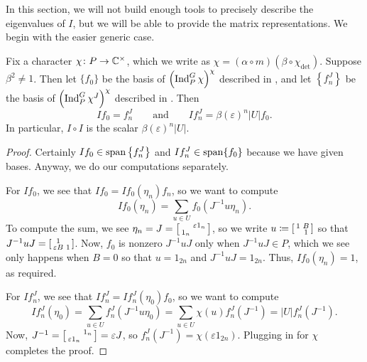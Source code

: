 In this section, we will not build enough tools to precisely describe the eigenvalues of $I$, but we will be able to provide the matrix representations. We begin with the easier generic case.
\begin{proposition} \label{prop:generic-intertwining}
	Fix a character $\chi\colon P\to\mathbb C^\times$, which we write as $\chi=(\alpha\circ m)(\beta\circ\chi_{\det})$. Suppose $\beta^2\ne1$. Then let $\{f_0\}$ be the basis of $\left(\operatorname{Ind}_P^G\chi\right)^\chi$ described in , and let $\left\{f_n^J\right\}$ be the basis of $\left(\operatorname{Ind}_P^G\chi^J\right)^\chi$ described in . Then
	\[If_0=f_n^J\qquad\text{and}\qquad If_n^J=\beta(\varepsilon)^n\left|U\right|f_0.\]
	In particular, $I\circ I$ is the scalar $\beta(\varepsilon)^n\left|U\right|$.
\end{proposition}
\begin{proof}
	Certainly $If_0\in\operatorname{span}\left\{f_n^J\right\}$ and $If_n^J\in\operatorname{span}\{f_0\}$ because we have given bases. Anyway, we do our computations separately.
	
	For $If_0$, we see that $If_0=If_0(\eta_n)f_n$, so we want to compute
	\[If_0(\eta_n)=\sum_{u\in U}f_0\left(J^{-1}u\eta_n\right).\]
	To compute the sum, we see $\eta_n=J=\begin{bsmallmatrix}
		& \varepsilon1_n \\ 1_n
	\end{bsmallmatrix}$, so we write $u\coloneqq\begin{bsmallmatrix}
		1 & B \\ & 1
	\end{bsmallmatrix}$ so that $J^{-1}uJ=\begin{bsmallmatrix}
		1 \\ \varepsilon B & 1
	\end{bsmallmatrix}$. Now, $f_0$ is nonzero $J^{-1}uJ$ only when $J^{-1}uJ\in P$, which we see only happens when $B=0$ so that $u=1_{2n}$ and $J^{-1}uJ=1_{2n}$. Thus, $If_0(\eta_n)=1$, as required.
	
	For $If_n^J$, we see that $If_n^J=If_n^J(\eta_0)f_0$, so we want to compute
	\[If_n^J(\eta_0)=\sum_{u\in U}f_n^J\left(J^{-1}u\eta_0\right)=\sum_{u\in U}\chi(u)f_n^J\left(J^{-1}\right)=\left|U\right|f_n^J\left(J^{-1}\right).\]
	Now, $J^{-1}=\begin{bsmallmatrix}
		& 1_n \\ \varepsilon1_n
	\end{bsmallmatrix}=\varepsilon J$, so $f_n^J\left(J^{-1}\right)=\chi(\varepsilon1_{2n})$. Plugging in for $\chi$ completes the proof.
\end{proof}

